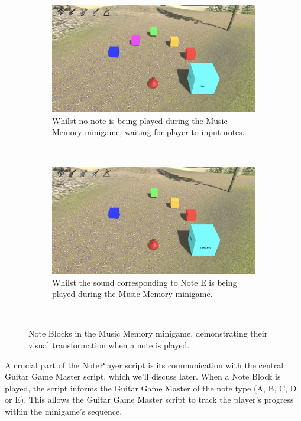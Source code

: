 \documentclass{l4proj}
\begin{document}
\begin{figure}[h]
    \centering
    \begin{subfigure}[b]{0.45\textwidth}
        \includegraphics[width=\textwidth]{dissertation/images/Memory_Game_HarmonyScape.png}
        \caption{Whilst no note is being played during the Music Memory minigame, waiting for player to input notes.}
        \label{fig:mem_game_unplayed}
    \end{subfigure}
    ~ 
    \begin{subfigure}[b]{0.45\textwidth}
        \includegraphics[width=\textwidth]{dissertation/images/Memory_Game_During.png}
        \caption{Whilst the sound corresponding to Note E is being played during the Music Memory minigame.}
        \label{fig:mem_game_played}
    \end{subfigure}
    ~     
    \caption{Note Blocks in the Music Memory minigame, demonstrating their visual transformation when a note is played.
    }
    \label{fig:mem_game} 
\end{figure}

A crucial part of the NotePlayer script is its communication with the central Guitar Game Master script, which we'll discuss later. When a Note Block is played, the script informs the Guitar Game Master of the note type (A, B, C, D or E). This allows the Guitar Game Master script to track the player's progress within the minigame's sequence.
\end{document}
